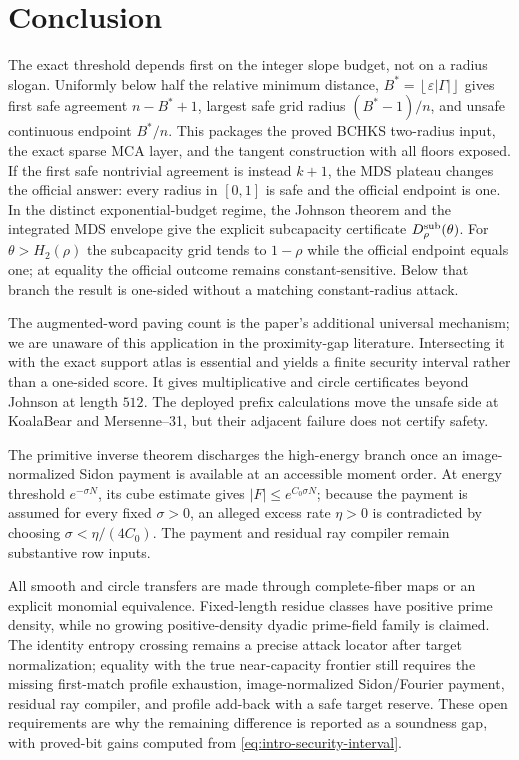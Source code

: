 \documentclass[11pt,a4paper]{amsart}
\numberwithin{equation}{section}
\theoremstyle{remark}
\newcommand{\eps}{\varepsilon}
\newcommand{\abs}[1]{\lvert #1\rvert}
\newcommand{\floor}[1]{\left\lfloor #1\right\rfloor}
\begin{document}
\section{Conclusion}\label{sec:conclusion}

The exact threshold depends first on the integer slope budget, not on a
radius slogan.  Uniformly below half the relative minimum distance,
\(B^*=\floor{\eps\abs\Gamma}\) gives first safe agreement
\(n-B^*+1\), largest safe grid radius \((B^*-1)/n\), and unsafe
continuous endpoint \(B^*/n\).  This packages the proved BCHKS
two-radius input, the exact sparse MCA layer, and the tangent construction
with all floors exposed.  If the first safe nontrivial agreement is instead
\(k+1\), the MDS plateau changes the official answer: every radius in
\([0,1]\) is safe and the official endpoint is one.  In the distinct
exponential-budget regime, the Johnson theorem and the integrated MDS
envelope give the explicit subcapacity certificate
\(D_\rho^{\rm sub}(\theta)\).  For
\(\theta>H_2(\rho)\) the subcapacity grid tends to \(1-\rho\) while the
official endpoint equals one; at equality the official outcome remains
constant-sensitive.  Below that branch the result is one-sided without a
matching constant-radius attack.

The augmented-word paving count is the paper's additional universal mechanism;
we are unaware of this application in the proximity-gap literature.
Intersecting it with the exact support atlas is essential and yields a
finite security interval rather than a one-sided score.  It gives
multiplicative and circle certificates beyond Johnson at length \(512\).
The deployed prefix calculations move the unsafe side at KoalaBear and Mersenne--31,
but their adjacent failure does not certify safety.

The primitive inverse theorem discharges the high-energy branch once an
image-normalized Sidon payment is available at an accessible moment order.
At energy threshold \(e^{-\sigma N}\), its cube estimate gives
\(\abs F\le e^{C_0\sigma N}\); because the payment is assumed for every
fixed \(\sigma>0\), an alleged excess rate \(\eta>0\) is contradicted by
choosing \(\sigma<\eta/(4C_0)\).  The payment and residual ray compiler remain substantive row
inputs.

All smooth and circle transfers are made through complete-fiber maps or
an explicit monomial equivalence.  Fixed-length residue classes have
positive prime density, while no growing positive-density dyadic
prime-field family is claimed.  The identity entropy crossing remains a
precise attack locator after target normalization; equality with the true
near-capacity frontier still requires the missing first-match profile
exhaustion, image-normalized Sidon/Fourier payment, residual ray compiler,
and profile add-back with a safe target reserve.  These open
requirements are why the remaining difference is reported as a
soundness gap, with proved-bit gains computed from
\eqref{eq:intro-security-interval}.
\end{document}
